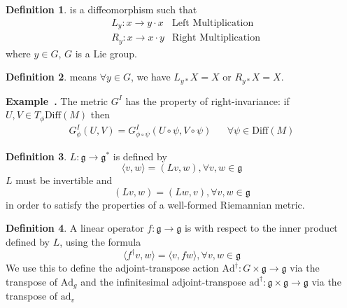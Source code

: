\documentclass[a4paper]{article}
\theoremstyle{definition}
\newtheorem{definition}{Definition}
\theoremstyle{plain}
\newcounter{example}{Example}
\newenvironment{example}[1][]{\refstepcounter{example}\par\medskip
   \noindent \textbf{Example~\theexample. #1} \rmfamily}{\medskip}
\begin{document}
\begin{definition}
 is a diffeomorphism such that
\begin{align*}
    &L_y:x\rightarrow y\cdot x & \text{Left Multiplication}\\
    &R_y:x\rightarrow x\cdot y & \text{Right Multiplication}
\end{align*}
where $y\in G$, $G$ is a Lie group.
\end{definition}

\begin{definition}
 means $\forall y\in G$, we have $L_{y*}X=X \text{ or } R_{y*}X=X$.
\end{definition}

\begin{example}
The metric $G^I$ has the property of right-invariance: if $U,V\in T_\phi\mathrm{Diff}(M)$ then
\begin{align*}
    G^I_\phi(U,V)=G^I_{\phi\circ\psi}(U\circ\psi,V\circ\psi) && \forall\psi\in\mathrm{Diff}(M)
\end{align*}
\end{example}

\begin{definition}
 $L:\mathfrak{g}\rightarrow\mathfrak{g}^*$ is defined by
\begin{equation*}
    \langle v,w\rangle=(Lv,w), \forall v,w\in\mathfrak{g}
\end{equation*}
$L$ must be invertible and
\begin{equation*}
    (Lv,w)=(Lw,v), \forall v,w\in\mathfrak{g}
\end{equation*}
in order to satisfy the properties of a well-formed Riemannian metric.
\end{definition}

\begin{definition}
A linear operator $f:\mathfrak{g}\rightarrow\mathfrak{g}$ is  with respect to the inner product defined by $L$, using the formula
\begin{equation*}
    \langle f^\dagger v,w\rangle=\langle v,fw\rangle, \forall v,w\in\mathfrak{g}
\end{equation*}
We use this to define the adjoint-transpose action $\mathrm{Ad}^\dagger:G\times\mathfrak{g}\rightarrow\mathfrak{g}$ via the transpose of $\mathrm{Ad}_g$ and the infinitesimal adjoint-transpose $\mathrm{ad}^\dagger:\mathfrak{g}\times\mathfrak{g}\rightarrow\mathfrak{g}$ via the transpose of $\mathrm{ad}_v$
\end{definition}
\end{document}
